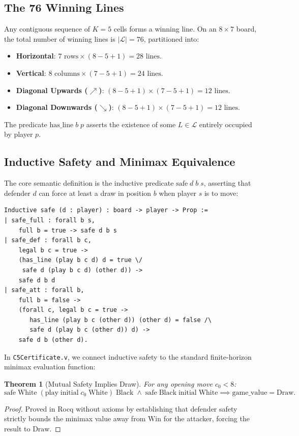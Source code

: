 \documentclass[11pt,reqno]{amsart}
\theoremstyle{plain}
\newtheorem{theorem}{Theorem}[section]
\theoremstyle{definition}
\theoremstyle{remark}
\begin{document}
\subsection{The 76 Winning Lines}
Any contiguous sequence of $K = 5$ cells forms a winning line. On an $8 \times 7$ board, the total number of winning lines is $|\mathcal{L}| = 76$, partitioned into:
\begin{itemize}
    \item \textbf{Horizontal}: $7 \text{ rows} \times (8 - 5 + 1) = 28 \text{ lines}$.
    \item \textbf{Vertical}: $8 \text{ columns} \times (7 - 5 + 1) = 24 \text{ lines}$.
    \item \textbf{Diagonal Upwards ($\nearrow$)}: $(8 - 5 + 1) \times (7 - 5 + 1) = 12 \text{ lines}$.
    \item \textbf{Diagonal Downwards ($\searrow$)}: $(8 - 5 + 1) \times (7 - 5 + 1) = 12 \text{ lines}$.
\end{itemize}
The predicate $\text{has\_line}\; b\; p$ asserts the existence of some $L \in \mathcal{L}$ entirely occupied by player $p$.

\subsection{Inductive Safety and Minimax Equivalence}
The core semantic definition is the inductive predicate $\text{safe}\; d\; b\; s$, asserting that defender $d$ can force at least a draw in position $b$ when player $s$ is to move:
\begin{lstlisting}[language=Coq]
Inductive safe (d : player) : board -> player -> Prop :=
| safe_full : forall b s,
    full b = true -> safe d b s
| safe_def : forall b c,
    legal b c = true ->
    (has_line (play b c d) d = true \/ 
     safe d (play b c d) (other d)) ->
    safe d b d
| safe_att : forall b,
    full b = false ->
    (forall c, legal b c = true ->
       has_line (play b c (other d)) (other d) = false /\
       safe d (play b c (other d)) d) ->
    safe d b (other d).
\end{lstlisting}

In \texttt{C5Certificate.v}, we connect inductive safety to the standard finite-horizon minimax evaluation function:
\begin{theorem}[Mutual Safety Implies Draw]
\label{thm:mutual_safety}
For any opening move $c_0 < 8$:
$$\text{safe}\;\text{White}\;(\text{play}\;\text{initial}\;c_0\;\text{White})\;\text{Black} \;\land\; \text{safe}\;\text{Black}\;\text{initial}\;\text{White} \implies \text{game\_value} = \text{Draw}.$$
\end{theorem}
\begin{proof}
Proved in Rocq without axioms by establishing that defender safety strictly bounds the minimax value away from $\text{Win}$ for the attacker, forcing the result to $\text{Draw}$.
\end{proof}
\end{document}
